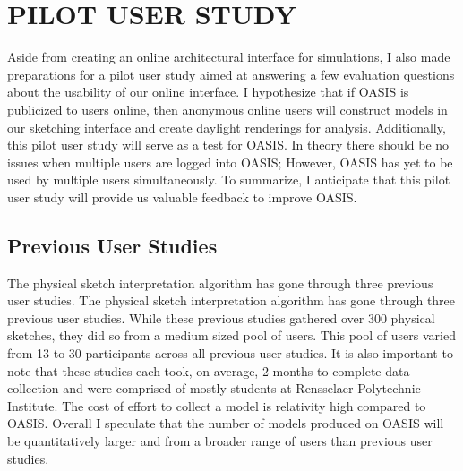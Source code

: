 \chapter{PILOT USER STUDY} \label{sec:userstudy}
Aside from creating an online architectural interface for simulations, I also made preparations for a pilot user study aimed at answering a few evaluation questions about the usability of our online interface.  I hypothesize that if OASIS is publicized to users online, then anonymous online users will construct models in our sketching interface and create daylight renderings for analysis.  Additionally, this pilot user study will serve as a test for OASIS.  In theory there should be no issues when multiple users are logged into OASIS; However, OASIS has yet to be used by multiple users simultaneously.  To summarize, I anticipate  that this pilot user study will provide us valuable feedback to improve OASIS.  \\

\section{Previous User Studies}
The physical sketch interpretation algorithm has gone through three previous user studies.  The physical sketch interpretation algorithm has gone through three previous user studies.  While these previous studies gathered over 300 physical sketches, they did so from a medium sized pool of users.  This pool of users varied from 13 to 30 participants across all previous user studies.  It is also important to note that these studies each took, on average, 2 months to complete data collection and were comprised of mostly students at Rensselaer Polytechnic Institute.  The cost of effort to collect a model is relativity high compared to OASIS.  Overall I speculate that the number of models produced on OASIS will be quantitatively larger  and from a broader range of users than previous user studies.  \\


